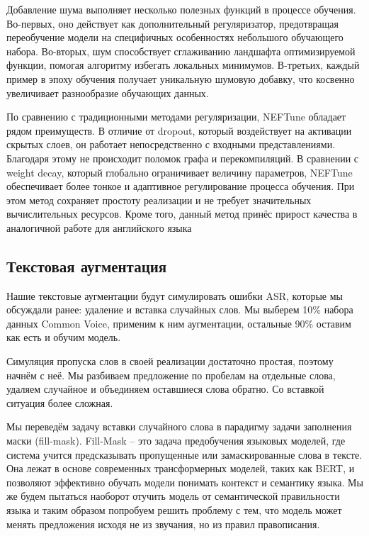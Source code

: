 Добавление шума выполняет несколько полезных функций в процессе обучения.
Во-первых, оно действует как дополнительный регуляризатор, предотвращая переобучение модели на специфичных особенностях небольшого обучающего набора.
Во-вторых, шум способствует сглаживанию ландшафта оптимизируемой функции, помогая алгоритму избегать локальных минимумов.
В-третьих, каждый пример в эпоху обучения получает уникальную шумовую добавку, что косвенно увеличивает разнообразие обучающих данных.

По сравнению с традиционными методами регуляризации, NEFTune обладает рядом преимуществ.
В отличие от dropout, который воздействует на активации скрытых слоев, он работает непосредственно с входными представлениями.
Благодаря этому не происходит поломок графа  и перекомпиляций.
В сравнении с weight decay, который глобально ограничивает величину параметров, NEFTune обеспечивает более тонкое и адаптивное регулирование процесса обучения.
При этом метод сохраняет простоту реализации и не требует значительных вычислительных ресурсов.
Кроме того, данный метод принёс прирост качества в аналогичной работе для английского языка

\subsection{Текстовая аугментация}
Нашие текстовые аугментации будут симулировать ошибки ASR, которые мы обсуждали ранее: удаление и вставка случайных слов.
Мы выберем 10\% набора данных Common Voice, применим к ним аугментации, остальные 90\% оставим как есть и обучим модель.

Симуляция пропуска слов в своей реализации достаточно простая, поэтому начнём с неё.
Мы разбиваем предложение по пробелам на отдельные слова, удаляем случайное и объединяем оставшиеся слова обратно.
Со вставкой ситуация более сложная.

Мы переведём задачу вставки случайного слова в парадигму задачи заполнения маски (fill-mask).
Fill-Mask -- это задача предобучения языковых моделей, где система учится предсказывать пропущенные или замаскированные слова в тексте.
Она лежат в основе современных трансформерных моделей, таких как BERT\cite{devlin2019bert}, и позволяют эффективно обучать модели понимать контекст и семантику языка.
Мы же будем пытаться наоборот отучить модель от семантической правильности языка и таким образом попробуем решить проблему с тем, что модель может менять предложения исходя не из звучания, но из правил правописания.

